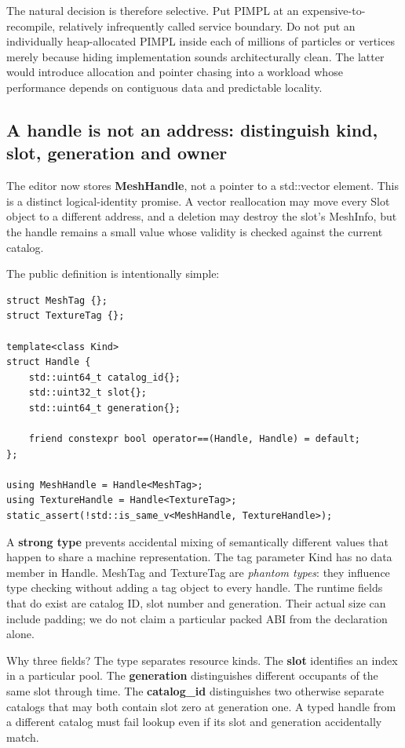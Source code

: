 The natural decision is therefore selective. Put PIMPL at an expensive-to-recompile, relatively infrequently called service boundary. Do not put an individually heap-allocated PIMPL inside each of millions of particles or vertices merely because hiding implementation sounds architecturally clean. The latter would introduce allocation and pointer chasing into a workload whose performance depends on contiguous data and predictable locality.

\subsection{A handle is not an address: distinguish kind, slot, generation and owner}\label{01-foundations-i-ch007-a-handle-is-not-an-address-distinguish-kind-slot-generation-and-owner}

The editor now stores \textbf{MeshHandle}, not a pointer to a std::vector element. This is a distinct logical-identity promise. A vector reallocation may move every Slot object to a different address, and a deletion may destroy the slot's MeshInfo, but the handle remains a small value whose validity is checked against the current catalog.

The public definition is intentionally simple:

\begin{verbatim}
struct MeshTag {};
struct TextureTag {};

template<class Kind>
struct Handle {
    std::uint64_t catalog_id{};
    std::uint32_t slot{};
    std::uint64_t generation{};

    friend constexpr bool operator==(Handle, Handle) = default;
};

using MeshHandle = Handle<MeshTag>;
using TextureHandle = Handle<TextureTag>;
static_assert(!std::is_same_v<MeshHandle, TextureHandle>);
\end{verbatim}

A \textbf{strong type} prevents accidental mixing of semantically different values that happen to share a machine representation. The tag parameter Kind has no data member in Handle. MeshTag and TextureTag are \emph{phantom types}: they influence type checking without adding a tag object to every handle. The runtime fields that do exist are catalog ID, slot number and generation. Their actual size can include padding; we do not claim a particular packed ABI from the declaration alone.

Why three fields? The type separates resource kinds. The \textbf{slot} identifies an index in a particular pool. The \textbf{generation} distinguishes different occupants of the same slot through time. The \textbf{catalog\_id} distinguishes two otherwise separate catalogs that may both contain slot zero at generation one. A typed handle from a different catalog must fail lookup even if its slot and generation accidentally match.

